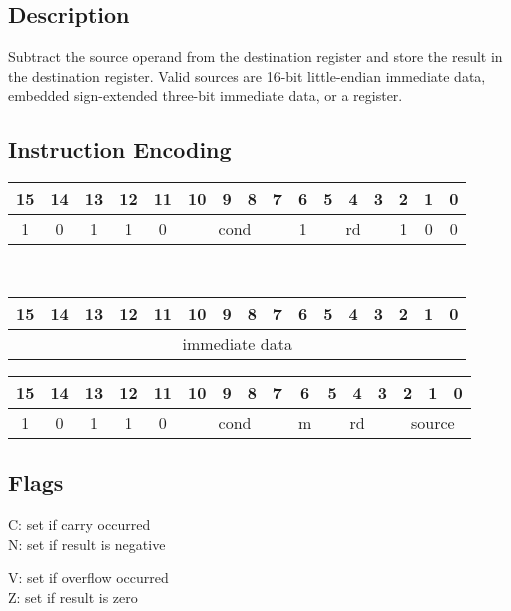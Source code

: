 \documentclass[11pt]{book}
\newcommand*{\encoding}[1]{\noindent
\begin{tabular}{|c|c|c|c|c|c|c|c|c|c|c|c|c|c|c|c|}
\multicolumn{1}{c}{15}&
\multicolumn{1}{c}{14}&
\multicolumn{1}{c}{13}&
\multicolumn{1}{c}{12}&
\multicolumn{1}{c}{11}&
\multicolumn{1}{c}{10}&
\multicolumn{1}{c}{9}&
\multicolumn{1}{c}{8}&
\multicolumn{1}{c}{7}&
\multicolumn{1}{c}{6}&
\multicolumn{1}{c}{5}&
\multicolumn{1}{c}{4}&
\multicolumn{1}{c}{3}&
\multicolumn{1}{c}{2}&
\multicolumn{1}{c}{1}&
\multicolumn{1}{c}{0}\\\hline
#1\\\hline
\end{tabular}}
\begin{document}
\subsection*{Description}
Subtract the source operand from the destination register
and store the result in the destination register.
Valid sources are 16-bit little-endian immediate data,
embedded sign-extended three-bit immediate data,
or a register.

\subsection*{Instruction Encoding}
\encoding{1&0&1&1&0%
&\multicolumn{4}{|c|}{cond}%
&1&\multicolumn{3}{|c|}{rd}&1&0&0}\\\null\qquad
\encoding{\multicolumn{16}{|c|}{immediate data}}

\vspace{2\baselineskip}
\encoding{1&0&1&1&0%
&\multicolumn{4}{|c|}{cond}%
&m&\multicolumn{3}{|c|}{rd}&\multicolumn{3}{|c|}{source}}

\subsection*{Flags}
\begin{multicols}{2}\noindent
  C: set if carry occurred\\
  N: set if result is negative

  \columnbreak\noindent
  V: set if overflow occurred\\
  Z: set if result is zero
\end{multicols}
\end{document}
